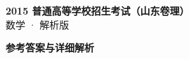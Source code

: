 \documentclass[zihao=-4, a4paper]{ctexart}
\begin{document}
\begin{center}
  {\Large\bfseries 2015 普通高等学校招生考试（山东卷理）}\\[4pt]
  {\large 数学 · 解析版}
\end{center}
\medskip
{}

\clearpage
{}
\begin{center}{\Large\bfseries 参考答案与详细解析}\end{center}
\medskip

\end{document}

